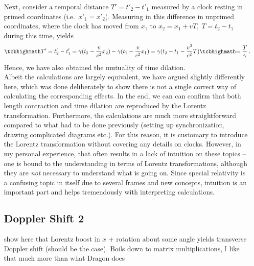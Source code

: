 \documentclass[../relativity_main.tex]{subfiles}
\begin{document}
Next, consider a temporal distance $T' = t'_2 - t'_1$ measured by a clock resting in primed coordinates (i.e.~$x'_1 = x'_2$). Measuring in this difference in unprimed coordinates, where the clock has moved from $x_1$ to $x_2 = x_1 + v T, \; T = t_2 - t_1$ during this time, yields
\begin{equation}
	\eqbox{T'} = t'_2 - t'_1 = \gamma (t_2 - \frac{v}{c^2} x_2) - \gamma (t_1 - \frac{v}{c^2} x_1) = \gamma (t_2 - t_1 - \frac{v^2}{c^2} T) \eqbox{= \frac{T}{\gamma}} \, .
\end{equation}
Hence, we have also obtained the mutuality of time dilation.\\


Albeit the calculations are largely equivalent, we have argued slightly differently here, which was done deliberately to show there is not a single correct way of calculating the corresponding effects. In the end, we can can confirm that both length contraction and time dilation are reproduced by the Lorentz transformation. Furthermore, the calculations are much more straightforward compared to what had to be done previously (setting up synchronization, drawing complicated diagrams etc.). For this reason, it is customary to introduce the Lorentz transformation without covering any details on clocks. However, in my personal experience, that often results in a lack of intuition on these topics -- one is bound to the understanding in terms of Lorentz transformations, although they are \emph{not} necessary to understand what is going on. Since special relativity is a confusing topic in itself due to several frames and new concepts, intuition is an important part and helps tremendously with interpreting calculations.



		\subsection{Doppler Shift 2}

show here that Lorentz boost in $x$ + rotation about some angle yields transverse Doppler shift (should be the case). Boils down to matrix multiplications, I like that much more than what Dragon does
\end{document}
